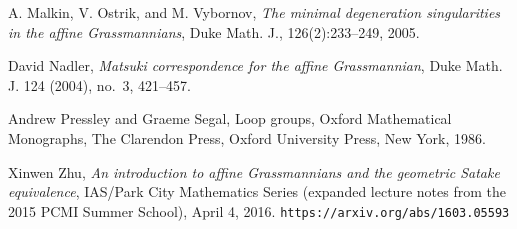 \begin{thebibliography}{[HPLqjm]}


 A. Malkin, V. Ostrik, and M. Vybornov, {\em  The minimal degeneration singularities in the affine Grassmannians}, Duke Math. J., 126(2):233–249,
2005.

 David Nadler, {\em Matsuki correspondence for the affine Grassmannian}, Duke Math. J. 124 (2004), no.\ 3,
421–457.

Andrew Pressley and Graeme Segal, Loop groups, Oxford Mathematical Monographs, The Clarendon Press, Oxford University Press, New York, 1986. 

 Xinwen Zhu, {\em An introduction to affine Grassmannians and the geometric Satake equivalence}, IAS/Park City Mathematics Series (expanded lecture notes from the 2015 PCMI Summer School), April 4, 2016.  \verb+https://arxiv.org/abs/1603.05593+
\end{thebibliography}


